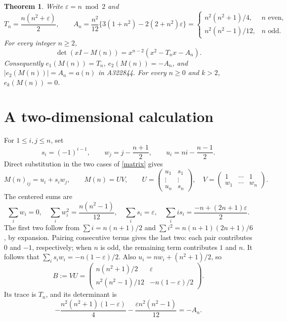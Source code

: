 \documentclass[11pt]{article}
\newtheorem{theorem}{Theorem}
\newcommand{\eps}{\varepsilon}
\begin{document}
\begin{theorem}\label{main}
Write $\eps=n\bmod2$ and
\begin{equation}\label{constants}
 T_n=\frac{n(n^2+\eps)}2,\qquad
 A_n=\frac{n^2}{12}\{3(1+n^2)-2(2+n^2)\eps\}
 =\begin{cases}
 n^2(n^2+1)/4,&n\text{ even},\\
 n^2(n^2-1)/12,&n\text{ odd}.
 \end{cases}
\end{equation}
For every integer $n\geq2$,
\begin{equation}\label{charpoly}
 \det(xI-M(n))=x^{n-2}(x^2-T_nx-A_n).
\end{equation}
Consequently $e_1(M(n))=T_n$, $e_2(M(n))=-A_n$, and
$|e_2(M(n))|=A_n=a(n)$ in A322844. For every $n\geq0$ and $k>2$,
$e_k(M(n))=0$.
\end{theorem}

\section{A two-dimensional calculation}
For $1\leq i,j\leq n$, set
\[
 s_i=(-1)^{i-1},\qquad
 w_j=j-\frac{n+1}{2},\qquad
 u_i=ni-\frac{n-1}{2}.
\]
Direct substitution in the two cases of \eqref{matrix} gives
\begin{equation}\label{factorization}
 M(n)_{ij}=u_i+s_iw_j,\qquad M(n)=UV,\qquad
 U=\begin{pmatrix}u_1&s_1\\\vdots&\vdots\\u_n&s_n\end{pmatrix},\quad
 V=\begin{pmatrix}1&\cdots&1\\w_1&\cdots&w_n\end{pmatrix}.
\end{equation}
The centered sums are
\begin{equation}\label{moments}
 \sum_i w_i=0,\quad
 \sum_i w_i^2=\frac{n(n^2-1)}{12},\quad
 \sum_i s_i=\eps,\quad
 \sum_i i s_i=\frac{-n+(2n+1)\eps}{2}.
\end{equation}
The first two follow from $\sum i=n(n+1)/2$ and
$\sum i^2=n(n+1)(2n+1)/6$, by expansion. Pairing consecutive terms
gives the last two: each pair contributes $0$ and $-1$, respectively;
when $n$ is odd, the remaining term contributes $1$ and $n$.
It follows that $\sum_i s_iw_i=-n(1-\eps)/2$.
Also $u_i=nw_i+(n^2+1)/2$, so
\begin{equation}\label{small}
 B:=VU=\begin{pmatrix}
 n(n^2+1)/2&\eps\\
 n^2(n^2-1)/12&-n(1-\eps)/2
 \end{pmatrix}.
\end{equation}
Its trace is $T_n$, and its determinant is
\[
 -\frac{n^2(n^2+1)(1-\eps)}4
 -\frac{\eps n^2(n^2-1)}{12}=-A_n.
\]
\end{document}
